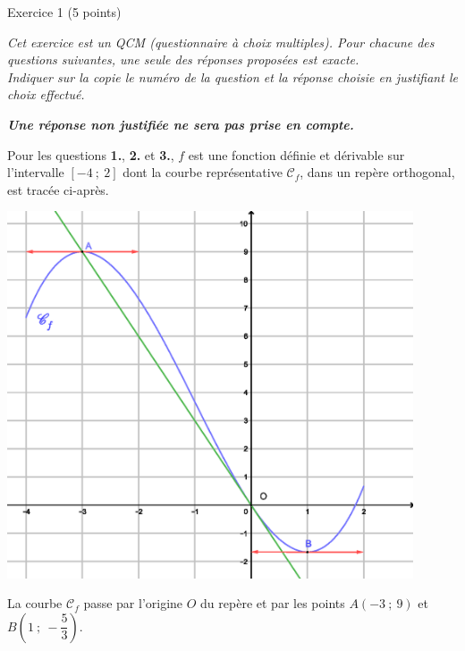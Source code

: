 
%
\begin{h2}Exercice 1 (5 points)\end{h2}
\par
\emph{Cet exercice est un QCM (questionnaire à choix multiples). Pour chacune des questions suivantes, une seule des réponses proposées est exacte. \\Indiquer sur la copie le numéro de la question et la réponse choisie en justifiant le choix effectué. }
\par
\medskip
\par
\emph{\textbf{Une réponse non justifiée ne sera pas prise en compte.}}
\par
Pour les questions \textbf{1.}, \textbf{2.} et \textbf{3.}, $f$ est une fonction définie et dérivable sur l'intervalle $[-4~;~2]$ dont la courbe représentative $\mathscr{C}_{f}$, dans un repère orthogonal, est tracée ci-après.
\par
\begin{center}
     \begin{extern}%
          \includegraphics[width=0.9\textwidth]{images/BBESL-s1-1-1}%
     \end{extern}
\end{center}
\par
La courbe $\mathscr{C}_{f}$ passe par l'origine $O$ du repère et par les points $A(-3~;~9)$ et $B\left(1~;~-\dfrac{5}{3}\right)$.
